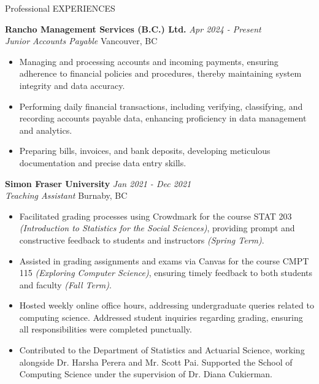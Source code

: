 \documentclass{resume} %
\begin{document}
\begin{rSection}{Professional EXPERIENCES}

{\bf Rancho Management Services (B.C.) Ltd.} \hfill {\em Apr 2024 - Present} 
\\{\textit{Junior Accounts Payable} \hfill {Vancouver, BC}}
\begin{itemize}
    \vspace{-0.2cm}\item Managing and processing accounts and incoming payments, ensuring adherence to financial policies and procedures, thereby maintaining system integrity and data accuracy.
    \vspace{-0.2cm}\item Performing daily financial transactions, including verifying, classifying, and recording accounts payable data, enhancing proficiency in data management and analytics.
    \vspace{-0.2cm}\item Preparing bills, invoices, and bank deposits, developing meticulous documentation and precise data entry skills.
\end{itemize}

{\bf Simon Fraser University} \hfill {\em Jan 2021 - Dec 2021} \\
{\textit{Teaching Assistant} \hfill {Burnaby, BC}}
\begin{itemize}
    \vspace{-0.2cm}\item Facilitated grading processes using Crowdmark for the course STAT 203 \textit{(Introduction to Statistics for the Social Sciences)}, providing prompt and constructive feedback to students and instructors \textit{(Spring Term)}.
    \vspace{-0.2cm}\item Assisted in grading assignments and exams via Canvas for the course CMPT 115 \textit{(Exploring Computer Science)}, ensuring timely feedback to both students and faculty \textit{(Fall Term)}.
    \vspace{-0.2cm}\item Hosted weekly online office hours, addressing undergraduate queries related to computing science. Addressed student inquiries regarding grading, ensuring all responsibilities were completed punctually.
    \vspace{-0.2cm}\item Contributed to the Department of Statistics and Actuarial Science, working alongside Dr. Harsha Perera and Mr. Scott Pai. Supported the School of Computing Science under the supervision of Dr. Diana Cukierman.
\end{itemize}



\end{rSection}
\end{document}
